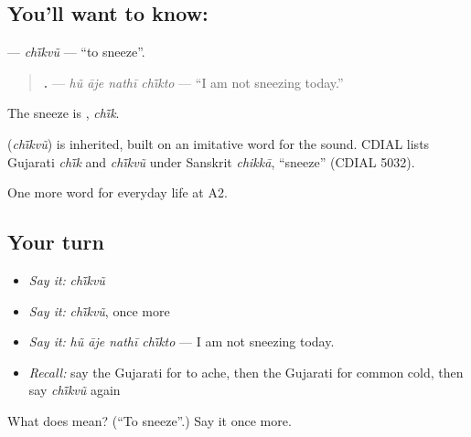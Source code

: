 \subsection*{You'll want to know: }
\textbf{} — \emph{chī̃kvũ} — \textquotedblleft{}to sneeze\textquotedblright{}.

\begin{quote}
\textbf{   .} — \emph{hũ āje nathī chī̃kto} — \textquotedblleft{}I am not sneezing today.\textquotedblright{}
\end{quote}

The sneeze is \textbf{}, \emph{chī̃k}.

\begin{cousinweb}
\textbf{} (\emph{chī̃kvũ}) is inherited, built on an imitative word for the sound. CDIAL lists Gujarati \emph{chī̃k} and \emph{chī̃kvũ} under Sanskrit \emph{chikkā}, \textquotedblleft{}sneeze\textquotedblright{} (CDIAL 5032).
\end{cousinweb}

\begin{grammarlens}[title={What you've built}]
One more word for everyday life at A2.
\end{grammarlens}

\subsection*{Your turn}
\begin{itemize}
\raggedright
  \item \emph{Say it:} \emph{chī̃kvũ}
  \item \emph{Say it:} \emph{chī̃kvũ}, once more
  \item \emph{Say it:} \emph{hũ āje nathī chī̃kto} — I am not sneezing today.
  \item \emph{Recall:} say the Gujarati for to ache, then the Gujarati for common cold, then say \emph{chī̃kvũ} again
\end{itemize}

\begin{tcolorbox}[breakable,colback=teal!4,colframe=teal!35!black,title={Before you move on}]
What does  mean? (\textquotedblleft{}To sneeze\textquotedblright{}.) Say it once more.
\end{tcolorbox}
